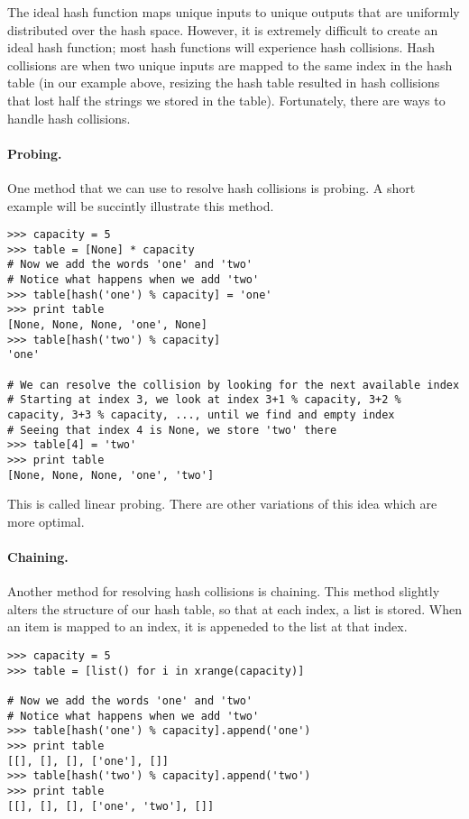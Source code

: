 The ideal hash function maps unique inputs to unique outputs that are uniformly distributed over the hash space.
However, it is extremely difficult to create an ideal hash function; most hash functions will experience hash collisions.
Hash collisions are when two unique inputs are mapped to the same index in the hash table (in our example above, resizing the hash table resulted in hash collisions that lost half the strings we stored in the table).
Fortunately, there are ways to handle hash collisions.

\paragraph{Probing.}
One method that we can use to resolve hash collisions is probing.
A short example will be succintly illustrate this method.
\begin{lstlisting}
>>> capacity = 5
>>> table = [None] * capacity
# Now we add the words 'one' and 'two'
# Notice what happens when we add 'two'
>>> table[hash('one') % capacity] = 'one'
>>> print table
[None, None, None, 'one', None]
>>> table[hash('two') % capacity]
'one'

# We can resolve the collision by looking for the next available index
# Starting at index 3, we look at index 3+1 % capacity, 3+2 % capacity, 3+3 % capacity, ..., until we find and empty index
# Seeing that index 4 is None, we store 'two' there
>>> table[4] = 'two'
>>> print table
[None, None, None, 'one', 'two']
\end{lstlisting}
This is called linear probing.
There are other variations of this idea which are more optimal.

\paragraph{Chaining.}
Another method for resolving hash collisions is chaining.
This method slightly alters the structure of our hash table, so that at each index, a list is stored.
When an item is mapped to an index, it is appeneded to the list at that index.
\begin{lstlisting}
>>> capacity = 5
>>> table = [list() for i in xrange(capacity)]

# Now we add the words 'one' and 'two'
# Notice what happens when we add 'two'
>>> table[hash('one') % capacity].append('one')
>>> print table
[[], [], [], ['one'], []]
>>> table[hash('two') % capacity].append('two')
>>> print table
[[], [], [], ['one', 'two'], []]
\end{lstlisting}

